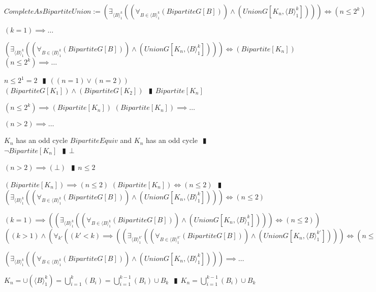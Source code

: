 \documentclass{book}
\newcommand{\abr}{:=}
\newcommand{\pipe}{$\phantom{(}\vrectangleblack\phantom{)}$}
\newcommand{\pr}[1]{\left(#1\right)}
\begin{document}
$CompleteAsBipartiteUnion \abr \pr{\exists_{\langle B \rangle_1^k}\pr{\pr{\forall_{B \in \langle B \rangle_1^k}(BipartiteG[B])} \land (UnionG[K_n, \langle B \rangle_1^k])}} \iff (n \leq 2^k)$
\begin{enumerate}
  \lit $(k = 1) \implies \ldots$
  \begin{enumerate}
    \lit $\pr{\exists_{\langle B \rangle_1^k}\pr{\pr{\forall_{B \in \langle B \rangle_1^k}(BipartiteG[B])} \land (UnionG[K_n, \langle B \rangle_1^k])}} \iff (Bipartite[K_n])$
    \lit $(n \leq 2^k) \implies \ldots$
    \begin{enumerate}
      \lit $n \leq 2^1 = 2$ \pipe $\pr{(n = 1) \lor (n = 2)}$
      \lit $(BipartiteG[K_1]) \land (BipartiteG[K_2])$ \pipe $Bipartite[K_n]$
    \end{enumerate}
    \lit $(n \leq 2^k) \implies (Bipartite[K_n])$
    \lit $(Bipartite[K_n]) \implies \ldots$
    \begin{enumerate}
      \lit $(n > 2) \implies \ldots$
      \begin{enumerate}
        \lit $K_n$ has an odd cycle 
        \lit $BipartiteEquiv$ and $K_n$ has an odd cycle \pipe $\lnot Bipartite[K_n]$ \pipe $\bot$
      \end{enumerate}
      \lit $(n > 2) \implies (\bot)$ \pipe $n \leq 2$
    \end{enumerate}
    \lit $(Bipartite[K_n]) \implies (n \leq 2)$
    \lit $(Bipartite[K_n]) \iff (n \leq 2)$ \pipe $\pr{\exists_{\langle B \rangle_1^k}\pr{\pr{\forall_{B \in \langle B \rangle_1^k}(BipartiteG[B])} \land (UnionG[K_n, \langle B \rangle_1^k])}} \iff (n \leq 2)$
  \end{enumerate}
  \lit $(k = 1) \implies \pr{\pr{\exists_{\langle B \rangle_1^k}\pr{\pr{\forall_{B \in \langle B \rangle_1^k}(BipartiteG[B])} \land (UnionG[K_n, \langle B \rangle_1^k])}} \iff (n \leq 2)}$
  \lit $\pr{(k > 1) \land \pr{\forall_{k'}\pr{(k' < k) \implies \pr{\pr{\exists_{\langle B \rangle_1^{k'}}\pr{\pr{\forall_{B \in \langle B \rangle_1^{k'}}(BipartiteG[B])} \land (UnionG[K_n, \langle B \rangle_1^{k'}])}} \iff (n \leq 2^{k'})}}}} \implies \ldots$
  \begin{enumerate}
    \lit $\pr{\exists_{\langle B \rangle_1^k}\pr{\pr{\forall_{B \in \langle B \rangle_1^k}(BipartiteG[B])} \land (UnionG[K_n, \langle B \rangle_1^k])}} \implies \ldots$
    \begin{enumerate}
      \lit $K_n = \cup(\langle B \rangle_1^k) = \bigcup \limits_{i=1}^{k}(B_i) = \bigcup \limits_{i=1}^{k - 1}(B_i) \cup B_k$ \pipe $K_n = \bigcup \limits_{i=1}^{k - 1}(B_i) \cup B_k$

\end{enumerate}
\end{enumerate}
\end{enumerate}
\end{document}
